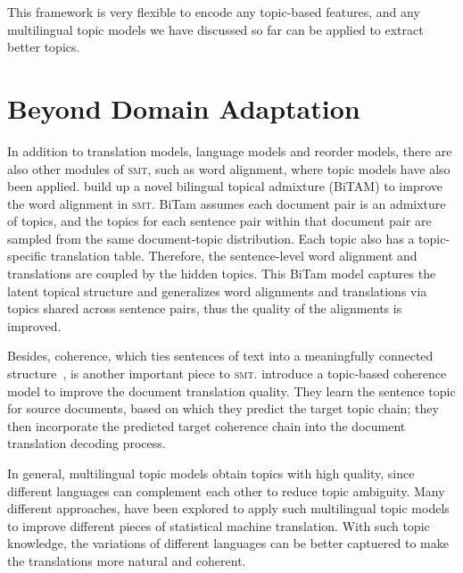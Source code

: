 This framework is very flexible to encode any topic-based features, and any multilingual topic models we have discussed so far can be applied to extract better topics.


\section{Beyond Domain Adaptation}

In addition to translation models, language models and reorder models, there are also other modules of \textsc{smt}, such as word alignment, where topic models have also been applied. \citet{zhao-06} build up a novel bilingual topical admixture (BiTAM) to improve the word alignment in \textsc{smt}. BiTam assumes each document pair is an admixture of topics, and the topics for each sentence pair within that document pair are sampled from the same document-topic distribution. Each topic also has a topic-specific translation table. Therefore, the sentence-level word alignment and translations are coupled by the hidden topics. This BiTam model captures the latent topical structure and generalizes word alignments and translations via topics shared across sentence pairs, thus the quality of the alignments is improved.

Besides, coherence, which ties sentences of text into a meaningfully connected structure~\citep{xiong-13}, is another important piece to \textsc{smt}.\citet{xiong-13} introduce a topic-based coherence model to improve the document translation quality. They learn the sentence topic for source documents, based on which they predict the target topic chain; they then incorporate the predicted target coherence chain into the document translation decoding process.


In general, multilingual topic models obtain topics with high quality, since different languages can complement each other to reduce topic ambiguity. Many different approaches, have been explored to apply such multilingual topic models to improve different pieces of statistical machine translation. With such topic knowledge, the variations of different languages can be better captuered to make the translations more natural and coherent.

